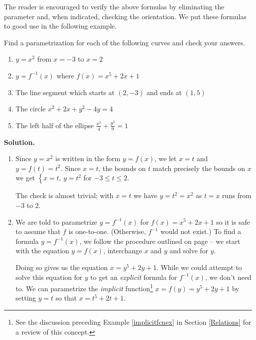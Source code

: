 \smallskip

The reader is encouraged to verify the above formulas by eliminating the parameter and, when indicated, checking the orientation.  We put these formulas to good use in the following example.

\begin{ex} \label{recttoparametric}  Find a parametrization for each of the following curves and check your answers.

\begin{enumerate}

\item $y = x^2$ from $x = -3$ to $x = 2$

\item  $y = f^{-1}(x)$ where $f(x) = x^5 + 2x + 1$

\item  The line segment which starts at $(2,-3)$ and ends at $(1,5)$

\item  The circle $x^2 + 2x + y^2 - 4y = 4$

\item  The left half of the ellipse $\frac{x^2}{4} + \frac{y^2}{9} = 1$

\end{enumerate}

{\bf Solution.} 

\begin{enumerate}

\item  Since $y = x^2$ is written in the form $y = f(x)$, we let $x = t$ and $y = f(t) = t^2$.  Since $x=t$, the bounds on $t$ match precisely the bounds on $x$  we get $\left\{ x = t, \, y = t^2 \right.$ for $-3 \leq t \leq 2$.  

\smallskip

The check is almost trivial; with $x=t$ we have $y = t^2 = x^2$ as $t = x$ runs from $-3$ to $2$.

\item  We are told to parametrize $y = f^{-1}(x)$ for $f(x) = x^5 + 2x + 1$ so it is safe to assume that $f$ is one-to-one.  (Otherwise, $f^{-1}$ would not exist.)  To find a formula $y = f^{-1}(x)$, we  follow the procedure outlined on page \pageref{inverseprocedure} -- we start with the equation $y = f(x)$, interchange $x$ and $y$ and solve for $y$.  

\smallskip

Doing so gives us the equation $x = y^5+2y+1$.  While we could attempt to solve this equation for $y$ to get an \textit{explicit} formula for $f^{-1}(x)$, we don't need to.  We can parametrize the \textit{implicit} function\footnote{See the discussion preceding Example \ref{implicitfcnex} in Section \ref{Relations} for a review of this concept.}  $x = f(y) = y^5+2y+1$ by setting $y = t$ so that $x = t^5 + 2t + 1$.  


\end{enumerate}
\end{ex}
